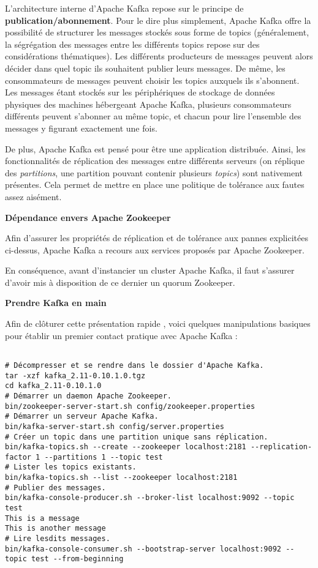 \documentclass[a4paper,oneside,11pt]{article}
\begin{document}
L'architecture interne d'Apache Kafka repose sur le principe de 
\textbf{publication/abonnement}. Pour le dire plus simplement, Apache Kafka
offre la possibilité de structurer les messages stockés sous forme
de topics (généralement, la ségrégation des messages entre les
différents topics repose sur des considérations thématiques).
Les différents producteurs de messages peuvent alors décider dans
quel topic ils souhaitent publier leurs messages. 
De même, les consommateurs de messages peuvent choisir les topics
auxquels ils s'abonnent. Les messages étant stockés sur les 
périphériques de stockage de données physiques des machines hébergeant
Apache Kafka, plusieurs consommateurs différents peuvent s'abonner au
même topic, et chacun pour lire l'ensemble des messages y figurant
exactement une fois.

De plus, Apache Kafka est pensé pour être une application distribuée.
Ainsi, les fonctionnalités de réplication des messages entre 
différents serveurs (on réplique des \textit{partitions}, une partition 
pouvant contenir plusieurs \textit{topics}) sont nativement présentes.
Cela permet de mettre en place une politique de tolérance aux fautes
assez aisément.

\textbf{Dépendance envers Apache Zookeeper}

Afin d'assurer les propriétés de réplication et de tolérance aux 
pannes explicitées ci-dessus, Apache Kafka a recours aux services
proposés par Apache Zookeeper.

En conséquence, avant d'instancier un cluster Apache Kafka, il faut
s'assurer d'avoir mis à disposition de ce dernier un quorum Zookeeper.

\textbf{Prendre Kafka en main}

Afin de clôturer cette présentation rapide , voici quelques 
manipulations basiques pour établir un premier contact pratique 
avec Apache Kafka :
\begin{verbatim}

# Décompresser et se rendre dans le dossier d'Apache Kafka.
tar -xzf kafka_2.11-0.10.1.0.tgz
cd kafka_2.11-0.10.1.0
# Démarrer un daemon Apache Zookeeper.
bin/zookeeper-server-start.sh config/zookeeper.properties
# Démarrer un serveur Apache Kafka.
bin/kafka-server-start.sh config/server.properties
# Créer un topic dans une partition unique sans réplication.
bin/kafka-topics.sh --create --zookeeper localhost:2181 --replication-factor 1 --partitions 1 --topic test
# Lister les topics existants.
bin/kafka-topics.sh --list --zookeeper localhost:2181
# Publier des messages.
bin/kafka-console-producer.sh --broker-list localhost:9092 --topic test
This is a message
This is another message
# Lire lesdits messages.
bin/kafka-console-consumer.sh --bootstrap-server localhost:9092 --topic test --from-beginning
\end{verbatim}
\end{document}

